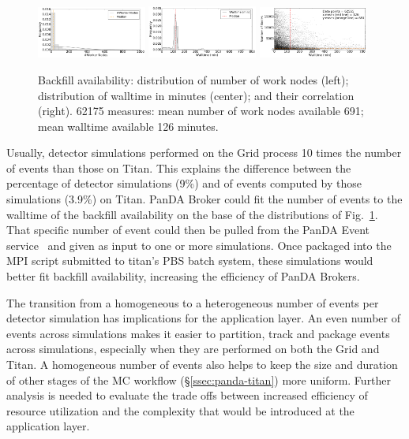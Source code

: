 \begin{figure}%
    \includegraphics[clip,width=0.32\textwidth]{figures/titan_backfill_wnodes_distribution.pdf}
    \includegraphics[clip,width=0.32\textwidth]{figures/titan_backfill_walltime_distribution.pdf}
    \includegraphics[clip,width=0.32\textwidth]{figures/titan_backfill_avail.png}
    \caption{Backfill availability: distribution of number of work nodes (left); distribution of walltime in minutes (center); and their correlation (right). 62175 measures: mean number of work nodes available 691; mean
    walltime available 126 minutes.}
\label{fig:backfill-distrib}
\end{figure}

Usually, detector simulations performed on the Grid process 10 times the number
of events than those on Titan. This explains the difference between the
percentage of detector simulations (9\%) and of events computed by those
simulations (3.9\%) on Titan. PanDA Broker could fit the number of events to the
walltime of the backfill availability on the base of the distributions of
Fig.~\ref{fig:backfill-distrib}. That specific number of event could then be
pulled from the PanDA Event service~\cite{calafiura2015atlas} and given as input
to one or more simulations. Once packaged into the MPI script submitted to
titan's PBS batch system, these simulations would better fit backfill
availability, increasing the efficiency of PanDA Brokers.

The transition from a homogeneous to a heterogeneous number of events per
detector simulation has implications for the application layer. An even number
of events across simulations makes it easier to partition, track and package
events across simulations, especially when they are performed on both the Grid
and Titan. A homogeneous number of events also helps to keep the size and
duration of other stages of the MC workflow (\S\ref{ssec:panda-titan}) more
uniform. Further analysis is needed to evaluate the trade offs between increased
efficiency of resource utilization and the complexity that would be introduced
at the application layer.

